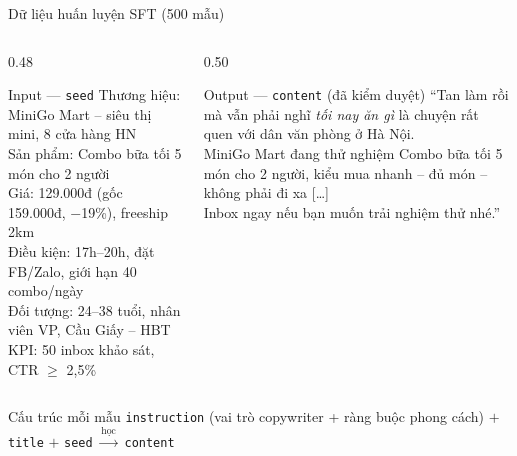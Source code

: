 \begin{frame}[t]{Dữ liệu huấn luyện SFT (500 mẫu)}
  \begin{columns}[T,onlytextwidth]
    \begin{column}{0.48\textwidth}
      \begin{block}{Input --- \texttt{seed}}
        \scriptsize
        Thương hiệu: MiniGo Mart -- siêu thị mini, 8 cửa hàng HN\\
        Sản phẩm: Combo bữa tối 5 món cho 2 người\\
        Giá: 129.000đ (gốc 159.000đ, $-$19\%), freeship 2km\\
        Điều kiện: 17h--20h, đặt FB/Zalo, giới hạn 40 combo/ngày\\
        Đối tượng: 24--38 tuổi, nhân viên VP, Cầu Giấy -- HBT\\
        KPI: 50 inbox khảo sát, CTR $\geq$ 2,5\%
      \end{block}
    \end{column}
    \begin{column}{0.50\textwidth}
      \begin{block}{Output --- \texttt{content} (đã kiểm duyệt)}
        \scriptsize
        ``Tan làm rồi mà vẫn phải nghĩ \textit{tối nay ăn gì} là
        chuyện rất quen với dân văn phòng ở Hà Nội.\\[0.3em]
        MiniGo Mart đang thử nghiệm Combo bữa tối 5 món cho 2
        người, kiểu mua nhanh -- đủ món -- không phải đi xa
        [\ldots]\\[0.3em]
        Inbox ngay nếu bạn muốn trải nghiệm thử nhé.''
      \end{block}
    \end{column}
  \end{columns}
  \vspace{0.5em}
  \begin{block}{Cấu trúc mỗi mẫu}
    \scriptsize
    \texttt{instruction} (vai trò copywriter + ràng buộc phong cách)
    $+$ \texttt{title} $+$ \texttt{seed} $\xrightarrow{\text{học}}$ \texttt{content}
  \end{block}
\end{frame}

